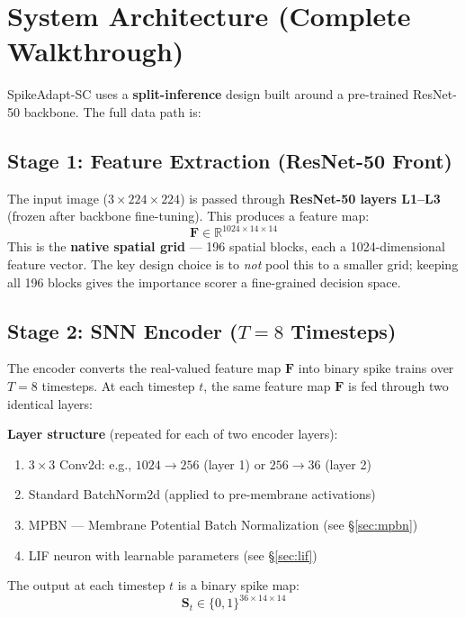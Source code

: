 \documentclass[11pt]{article}
\begin{document}
\section{System Architecture (Complete Walkthrough)}

SpikeAdapt-SC uses a \textbf{split-inference} design built around a pre-trained ResNet-50 backbone. The full data path is:

\subsection{Stage 1: Feature Extraction (ResNet-50 Front)}

The input image ($3 \times 224 \times 224$) is passed through \textbf{ResNet-50 layers L1--L3} (frozen after backbone fine-tuning). This produces a feature map:
\[
\mathbf{F} \in \mathbb{R}^{1024 \times 14 \times 14}
\]
This is the \textbf{native spatial grid} --- 196 spatial blocks, each a 1024-dimensional feature vector. The key design choice is to \emph{not} pool this to a smaller grid; keeping all 196 blocks gives the importance scorer a fine-grained decision space.

\subsection{Stage 2: SNN Encoder ($T=8$ Timesteps)}

The encoder converts the real-valued feature map $\mathbf{F}$ into binary spike trains over $T{=}8$ timesteps. At each timestep $t$, the same feature map $\mathbf{F}$ is fed through two identical layers:

\textbf{Layer structure} (repeated for each of two encoder layers):
\begin{enumerate}[nosep]
    \item $3{\times}3$ Conv2d: e.g., $1024 \to 256$ (layer 1) or $256 \to 36$ (layer 2)
    \item Standard BatchNorm2d (applied to pre-membrane activations)
    \item MPBN --- Membrane Potential Batch Normalization (see \S\ref{sec:mpbn})
    \item LIF neuron with learnable parameters (see \S\ref{sec:lif})
\end{enumerate}

The output at each timestep $t$ is a binary spike map:
\[
\mathbf{S}_t \in \{0, 1\}^{36 \times 14 \times 14}
\]
\end{document}

